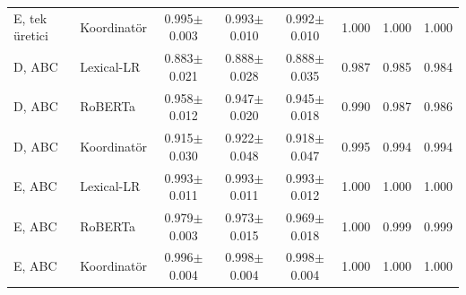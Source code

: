 \begin{table}[t]
\begin{tabular}{llcccccc}
E, tek üretici & Koordinatör & 0.995$\pm$0.003 & 0.993$\pm$0.010 & 0.992$\pm$0.010 & 1.000 & 1.000 & 1.000 \\
D, ABC & Lexical-LR & 0.883$\pm$0.021 & 0.888$\pm$0.028 & 0.888$\pm$0.035 & 0.987 & 0.985 & 0.984 \\
D, ABC & RoBERTa & 0.958$\pm$0.012 & 0.947$\pm$0.020 & 0.945$\pm$0.018 & 0.990 & 0.987 & 0.986 \\
D, ABC & Koordinatör & 0.915$\pm$0.030 & 0.922$\pm$0.048 & 0.918$\pm$0.047 & 0.995 & 0.994 & 0.994 \\
E, ABC & Lexical-LR & 0.993$\pm$0.011 & 0.993$\pm$0.011 & 0.993$\pm$0.012 & 1.000 & 1.000 & 1.000 \\
E, ABC & RoBERTa & 0.979$\pm$0.003 & 0.973$\pm$0.015 & 0.969$\pm$0.018 & 1.000 & 0.999 & 0.999 \\
E, ABC & Koordinatör & 0.996$\pm$0.004 & 0.998$\pm$0.004 & 0.998$\pm$0.004 & 1.000 & 1.000 & 1.000 \\
\bottomrule
\end{tabular}
\end{table}
